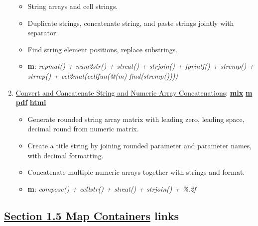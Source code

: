 \documentclass[
]{book}
\providecommand{\tightlist}{%
  \setlength{\itemsep}{0pt}\setlength{\parskip}{0pt}}
\begin{document}
\begin{enumerate}
  \begin{itemize}
  \tightlist
  \item
    String arrays and cell strings.
  \item
    Duplicate strings, concatenate string, and paste strings jointly with separator.
  \item
    Find string element positions, replace substrings.
  \item
    \textbf{m}: \emph{repmat() + num2str() + strcat() + strjoin() + fprintf() + strcmp() + strrep() + cel2mat(cellfun(@(m) find(strcmp())))}
  \end{itemize}
\item
  \href{https://fanwangecon.github.io/M4Econ/amto/string/htmlpdfm/fs_string_strcat.html}{Convert and Cancatenate String and Numeric Array Concatenations}: \href{https://github.com/FanWangEcon/M4Econ/blob/master/amto/string/fs_string_strcat.mlx}{\textbf{mlx}} \textbar{} \href{https://github.com/FanWangEcon/M4Econ/blob/master/amto/string/htmlpdfm/fs_string_strcat.m}{\textbf{m}} \textbar{} \href{https://github.com/FanWangEcon/M4Econ/blob/master/amto/string/htmlpdfm/fs_string_strcat.pdf}{\textbf{pdf}} \textbar{} \href{https://fanwangecon.github.io/M4Econ/amto/string/htmlpdfm/fs_string_strcat.html}{\textbf{html}}

  \begin{itemize}
  \tightlist
  \item
    Generate rounded string array matrix with leading zero, leading space, decimal round from numeric matrix.
  \item
    Create a title string by joining rounded parameter and parameter names, with decimal formatting.
  \item
    Concatenate multiple numeric arrays together with strings and format.
  \item
    \textbf{m}: \emph{compose() + cellstr() + strcat() + strjoin() + \%.2f}
  \end{itemize}
\end{enumerate}

\hypertarget{section-1.5-map-containersmap-containers-links}{%
\subsection{\texorpdfstring{\protect\hyperlink{map-containers}{Section 1.5 Map Containers} links}{Section 1.5 Map Containers links}}\label{section-1.5-map-containersmap-containers-links}}
\end{document}
